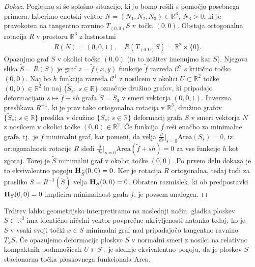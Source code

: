 \documentclass[12pt,a4paper,twoside]{article}
\theoremstyle{definition} %
\newenvironment{dokaz}[1][Dokaz]{\begin{proof}[#1]}{\end{proof}}
\theoremstyle{plain} %
\numberwithin{equation}{section}  %
\newcommand{\R}{\mathbb R}
\begin{document}
\begin{dokaz}
Poglejmo si še splošno situacijo, ki jo bomo rešili s pomočjo posebnega primera. Izberimo enotski vektor $N = (N_1,N_2,N_3) \in \R^3, \ N_3>0$, ki je pravokoten na tangentno ravnino $T_{(0,0)}S$ v točki $(0,0)$. Obstaja ortogonalna rotacija $R$ v prostoru $\R^3$ z lastnostmi
\begin{gather*}
R(N) = (0,0,1), \quad R(T_{(0,0)}S) = \R^2 \times \{0\}.
\end{gather*}
Opazujmo graf $S$ v okolici točke $(0,0)$ (in to zožitev imenujmo kar $S$).
Njegova slika $\widetilde{S} = R(S)$ je graf $z=\tilde{f}(x,y)$ funkcije $\tilde{f}$ razreda $\mathcal{C}^2$ s kritično točko $(0,0)$. Naj bo $h$ funkcija razreda $\mathcal{C}^{1}$ z nosilcem v okolici $U \subset \R^2$ točke $(0,0) \in \R^2$ in naj $\{ \widetilde{S}_{s}; \ s \in \R \}$ označuje družino grafov, ki pripadajo deformacijam $s \mapsto \tilde{f}+sh$ grafa $\widetilde{S} = \widetilde{S}_{0}$ v smeri vektorja $(0,0,1)$.
Inverzna preslikava $R^{-1}$, ki je prav tako ortogonalna rotacija v $\R^3$, družino grafov $\{ \widetilde{S}_{s}; \ s \in \R \}$ preslika v družino $\{ S_{s}; \ s \in \R \}$ deformacij grafa $S$ v smeri vektorja $N$ z nosilcem v okolici točke $(0,0) \in \R^2$. \newline
Če funkcija $f$ reši enačbo za minimalne grafe, tj.~je $f$ minimalni graf, kar pomeni, da velja $\frac{d}{ds} \big|_{s=0} \text{Area}(S_{s})=0$, iz ortogonalnosti rotacije $R$ sledi $\frac{d}{ds} \big|_{s=0} \text{Area}(\tilde{f}+sh)=0$ za vse funkcije $h$ kot zgoraj. Torej je $\widetilde{S}$ minimalni graf v okolici točke $(0,0)$. Po prvem delu dokaza je to ekvivalentno pogoju $\textup{\textbf{H}}_{\widetilde{S}}(0,0) = 0$. Ker je rotacija $R$ ortogonalna, tedaj tudi za prasliko $S = R^{-1}(\widetilde{S})$ velja $\textup{\textbf{H}}_{S}(0,0) = 0$. \newline
Obraten razmislek, ki ob predpostavki $\textup{\textbf{H}}_{S}(0,0) = 0$ implicira minimalnost grafa $f$, je povsem analogen.
\end{dokaz}

Trditev lahko geometrijsko interpretiramo na naslednji način: gladka ploskev $S \subset \R^3$ ima identično ničelni vektor povprečne ukrivljenosti natanko tedaj, ko je $S$ v vsaki svoji točki $x \in S$ minimalni graf nad pripadajočo tangentno ravnino $T_{x}S$.
Če opazujemo deformacije ploskve $S$ v normalni smeri z nosilci na relativno kompaktnih podmnožicah $U \Subset S^{\circ}$, je slednje ekvivalentno pogoju, da je ploskev $S$ stacionarna točka ploskovnega funkcionala $\text{Area}$.
\end{document}
